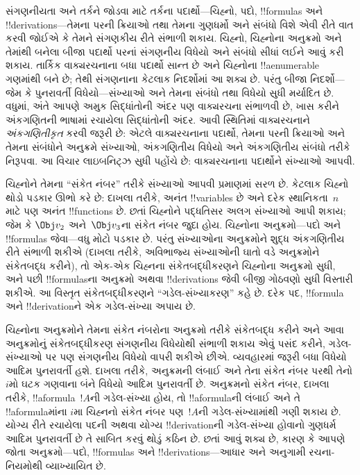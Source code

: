 \documentclass[../../../include/open-logic-section]{subfiles}
\begin{document}

સંગણનીયતા અને તર્કને જોડવા માટે તર્કના
પદાર્થો—ચિહ્નો, પદો, !!{formula}s અને
!!{derivation}s—તેમના પરની ક્રિયાઓ તથા
તેમના ગુણધર્મો અને સંબંધો વિશે એવી રીતે
વાત કરવી જોઈએ કે તેમને સંગણકીય રીતે
સંભાળી શકાય. ચિહ્નો, ચિહ્નોના અનુક્રમો
અને તેમાંથી બનેલા બીજા પદાર્થો પરનાં
સંગણનીય વિધેયો અને સંબંધો સીધાં લઈને
આવું કરી શકાય. તાર્કિક વાક્યરચનાના
બધા પદાર્થો સાન્ત છે અને ચિહ્નોના
!!a{enumerable} ગણમાંથી બને છે; તેથી
સંગણનાના કેટલાક નિદર્શોમાં આ શક્ય છે.
પરંતુ બીજા નિદર્શો—જેમ કે પુનરાવર્તી
વિધેયો—સંખ્યાઓ અને તેમના સંબંધો તથા
વિધેયો સુધી મર્યાદિત છે. વધુમાં, અંતે
આપણે અમુક સિદ્ધાંતોની અંદર પણ વાક્યરચના
સંભાળવી છે, ખાસ કરીને અંકગણિતની ભાષામાં
રચાયેલા સિદ્ધાંતોની અંદર. આવી સ્થિતિમાં
વાક્યરચનાને \emph{અંકગણિતીકૃત} કરવી
જરૂરી છે: એટલે વાક્યરચનાના પદાર્થો,
તેમના પરની ક્રિયાઓ અને તેમના સંબંધોને
અનુક્રમે સંખ્યાઓ, અંકગણિતીય વિધેયો અને
અંકગણિતીય સંબંધો તરીકે નિરૂપવા. આ
વિચાર લાઇબનિટ્ઝ સુધી પહોંચે છે: વાક્યરચનાના
પદાર્થોને સંખ્યાઓ આપવી.

ચિહ્નોને તેમના ``સંકેત નંબર'' તરીકે સંખ્યાઓ
આપવી પ્રમાણમાં સરળ છે. કેટલાક ચિહ્નો
થોડો પડકાર ઊભો કરે છે: દાખલા તરીકે,
અનંત !!{variable}s છે અને દરેક
સ્થાનિકતા~$n$ માટે પણ અનંત
!!{function}s છે. છતાં ચિહ્નોને પદ્ધતિસર
અલગ સંખ્યાઓ આપી શકાય; જેમ કે
$\Obj v_2$ અને~$\Obj v_3$ના સંકેત
નંબર જુદા હોય. ચિહ્નોના અનુક્રમો—પદો
અને !!{formula}s જેવા—વધુ મોટો પડકાર
છે. પરંતુ સંખ્યાઓના અનુક્રમોને શુદ્ધ
અંકગણિતીય રીતે સંભાળી શકીએ (દાખલા તરીકે,
અવિભાજ્ય સંખ્યાઓની ઘાતો વડે અનુક્રમોને
સંકેતબદ્ધ કરીને), તો એક-એક ચિહ્નના
સંકેતબદ્ધીકરણને ચિહ્નોના અનુક્રમો સુધી,
અને પછી !!{formula}sના અનુક્રમો અથવા
!!{derivation}s જેવી બીજી ગોઠવણો સુધી
વિસ્તારી શકીએ. આ વિસ્તૃત સંકેતબદ્ધીકરણને
``ગડેલ-સંખ્યાકરણ'' કહે છે. દરેક પદ,
!!{formula} અને !!{derivation}ને એક
ગડેલ-સંખ્યા અપાય છે.

ચિહ્નોના અનુક્રમોને તેમના સંકેત નંબરોના
અનુક્રમો તરીકે સંકેતબદ્ધ કરીને અને આવા
અનુક્રમોનું સંકેતબદ્ધીકરણ સંગણનીય વિધેયોથી
સંભાળી શકાય એવું પસંદ કરીને, ગડેલ-સંખ્યાઓ
પર પણ સંગણનીય વિધેયો વાપરી શકીએ છીએ.
વ્યવહારમાં જરૂરી બધા વિધેયો આદિમ
પુનરાવર્તી હશે. દાખલા તરીકે, અનુક્રમની
લંબાઈ અને તેના સંકેત નંબર પરથી તેનો
$i$મો ઘટક ગણવાના બંને વિધેયો આદિમ
પુનરાવર્તી છે. અનુક્રમનો સંકેત નંબર,
દાખલા તરીકે, !!a{formula}~$!A$ની
ગડેલ-સંખ્યા હોય, તો !!a{formula}ની
લંબાઈ અને તે !!a{formula}માંના $i$મા ચિહ્નનો સંકેત
નંબર પણ~$!A$ની ગડેલ-સંખ્યામાંથી
ગણી શકાય છે. યોગ્ય રીતે રચાયેલા પદની
અથવા યોગ્ય !!{derivation}ની ગડેલ-સંખ્યા
હોવાનો ગુણધર્મ આદિમ પુનરાવર્તી છે તે
સાબિત કરવું થોડું કઠિન છે. છતાં આવું
શક્ય છે, કારણ કે આપણે જોતા અનુક્રમો—પદો,
!!{formula}s અને !!{derivation}s—આધાર અને
અનુગામી રચના-નિયમોથી વ્યાખ્યાયિત છે.
\end{document}

